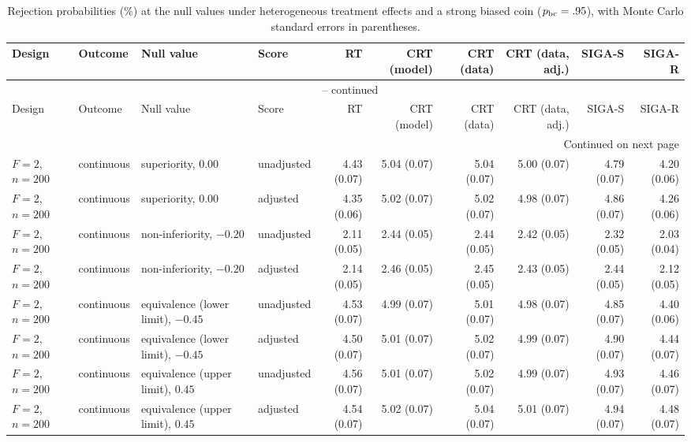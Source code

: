 \documentclass[12pt,a4paper]{article}
\theoremstyle{definition}
\theoremstyle{remark}\newtheorem{remark}{Remark}
\numberwithin{equation}{section}
\begin{document}
\clearpage
\begin{landscape}\begin{singlespace}\begingroup\footnotesize\setlength{\tabcolsep}{3.3pt}\renewcommand{\arraystretch}{1.0}\setlength{\LTcapwidth}{\linewidth}\setlength{\LTleft}{\fill}\setlength{\LTright}{\fill}
\begin{longtable}{@{}llllrrrrrr@{}}
\caption{Rejection probabilities (\%) at the null values under heterogeneous treatment effects and a strong biased coin ($p_{\rm bc}=.95$), with Monte Carlo standard errors in parentheses.}
\label{tab:supp-hetero-null-stress}\\
\toprule
Design & Outcome & Null value & Score & RT & CRT (model) & CRT (data) & CRT (data, adj.) & SIGA-S & SIGA-R\\
\midrule\endfirsthead
\multicolumn{10}{c}{\tablename\ \thetable{} -- continued}\\\toprule
Design & Outcome & Null value & Score & RT & CRT (model) & CRT (data) & CRT (data, adj.) & SIGA-S & SIGA-R\\
\midrule\endhead
\midrule\multicolumn{10}{r}{Continued on next page}\\\endfoot
\bottomrule\endlastfoot
$F=2$, $n=200$ & continuous & superiority, $0.00$ & unadjusted & 4.43 (0.07) & 5.04 (0.07) & 5.04 (0.07) & 5.00 (0.07) & 4.79 (0.07) & 4.20 (0.06)\\
$F=2$, $n=200$ & continuous & superiority, $0.00$ & adjusted & 4.35 (0.06) & 5.02 (0.07) & 5.02 (0.07) & 4.98 (0.07) & 4.86 (0.07) & 4.26 (0.06)\\
$F=2$, $n=200$ & continuous & non-inferiority, $-0.20$ & unadjusted & 2.11 (0.05) & 2.44 (0.05) & 2.44 (0.05) & 2.42 (0.05) & 2.32 (0.05) & 2.03 (0.04)\\
$F=2$, $n=200$ & continuous & non-inferiority, $-0.20$ & adjusted & 2.14 (0.05) & 2.46 (0.05) & 2.45 (0.05) & 2.43 (0.05) & 2.44 (0.05) & 2.12 (0.05)\\
$F=2$, $n=200$ & continuous & equivalence (lower limit), $-0.45$ & unadjusted & 4.53 (0.07) & 4.99 (0.07) & 5.01 (0.07) & 4.98 (0.07) & 4.85 (0.07) & 4.40 (0.06)\\
$F=2$, $n=200$ & continuous & equivalence (lower limit), $-0.45$ & adjusted & 4.50 (0.07) & 5.01 (0.07) & 5.02 (0.07) & 4.99 (0.07) & 4.90 (0.07) & 4.44 (0.07)\\
$F=2$, $n=200$ & continuous & equivalence (upper limit), $0.45$ & unadjusted & 4.56 (0.07) & 5.01 (0.07) & 5.02 (0.07) & 4.99 (0.07) & 4.93 (0.07) & 4.46 (0.07)\\
$F=2$, $n=200$ & continuous & equivalence (upper limit), $0.45$ & adjusted & 4.54 (0.07) & 5.02 (0.07) & 5.04 (0.07) & 5.01 (0.07) & 4.94 (0.07) & 4.48 (0.07)\\

\end{longtable}
\end{singlespace}
\end{landscape}
\end{document}
